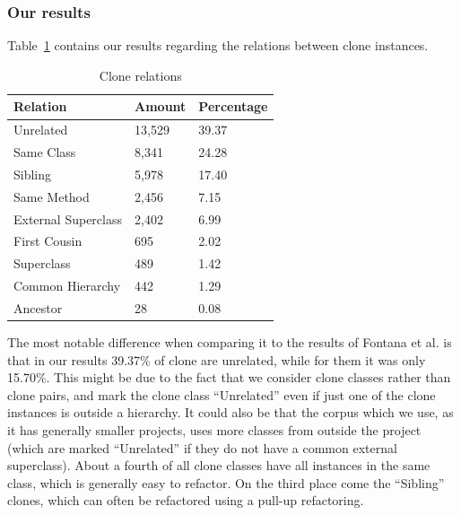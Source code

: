\documentclass[a4paper]{article}
\begin{document}
\subsubsection{Our results} \label{chap:ourmeasurements}
Table~\ref{table:relations} contains our results regarding the relations between clone instances.

\begin{table}[H]
  \begin{center}
  \caption{Clone relations} \label{table:relations}
  \bigskip
\begin{tabular}{|l|l|l|} \hline
\textbf{Relation}  & \textbf{Amount} & \textbf{Percentage} \\ \hline
Unrelated          & 13,529           & 39.37               \\ \hline
Same Class          & 8,341            & 24.28               \\ \hline
Sibling            & 5,978            & 17.40               \\ \hline
Same Method         & 2,456            & 7.15                \\ \hline
External Superclass & 2,402            & 6.99                \\ \hline
First Cousin        & 695             & 2.02                \\ \hline
Superclass         & 489             & 1.42                \\ \hline
Common Hierarchy    & 442             & 1.29                \\ \hline
Ancestor           & 28              & 0.08               \\ \hline
\end{tabular}
\end{center}
\end{table}

The most notable difference when comparing it to the results of Fontana et al. \cite{fontana2015duplicated} is that in our results 39.37\% of clone are unrelated, while for them it was only 15.70\%. This might be due to the fact that we consider clone classes rather than clone pairs, and mark the clone class ``Unrelated'' even if just one of the clone instances is outside a hierarchy. It could also be that the corpus which we use, as it has generally smaller projects, uses more classes from outside the project (which are marked ``Unrelated'' if they do not have a common external superclass). About a fourth of all clone classes have all instances in the same class, which is generally easy to refactor. On the third place come the ``Sibling'' clones, which can often be refactored using a pull-up refactoring.
\end{document}
